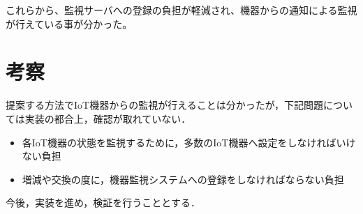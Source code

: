 これらから、監視サーバへの登録の負担が軽減され、機器からの通知による監視が行えている事が分かった。

\section{考察}
提案する方法でIoT機器からの監視が行えることは分かったが，下記問題については実装の都合上，確認が取れていない．
\begin{itemize}
\item 各IoT機器の状態を監視するために，多数のIoT機器へ設定をしなければいけない負担
\item 増減や交換の度に，機器監視システムへの登録をしなければならない負担
\end{itemize}
今後，実装を進め，検証を行うこととする．

